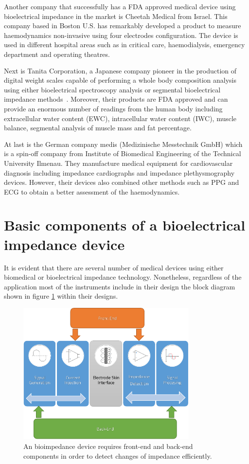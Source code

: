 Another company that successfully has a FDA approved medical device using bioelectrical impedance in the market is Cheetah Medical \cite{cheetah} from Israel. This company based in Boston U.S. has remarkably developed a product to measure haemodynamics non-invasive using four electrodes configuration. The device is used in different hospital areas such as in critical care, haemodialysis, emergency department and operating theatres.

Next is Tanita Corporation, a Japanese company pioneer in the production of digital weight scales capable of performing a whole body composition analysis using either bioelectrical spectroscopy analysis or segmental bioelectrical impedance methods~\cite{tanita}. Moreover, their products are FDA approved and can provide an enormous number of readings from the human body including extracellular water content (EWC), intracellular water content (IWC), muscle balance, segmental analysis of muscle mass and fat percentage.

At last is the German company medis (Medizinische Messtechnik GmbH) which is a spin-off company from Institute of Biomedical Engineering of the Technical University Ilmenau. They manufacture medical equipment for cardiovascular diagnosis including impedance cardiographs and impedance plethysmography devices. However, their devices also combined other methods such as PPG and ECG to obtain a better assessment of the haemodynamics. 

\section{Basic components of a bioelectrical impedance device}
\label{section impedance basic}
It is evident that there are several number of medical devices using either biomedical or bioelectrical impedance technology. Nonetheless, regardless of the application most of the instruments include in their design the block diagram shown in figure \ref{fig:block diagram bioimpedance} within their designs. 

\begin{figure}[!htpb]
	\centering
	\includegraphics[width=9cm,keepaspectratio]{figure11}    
	\caption[Block diagram of a common bioimpedance device]{An bioimpedance device requires front-end and back-end components in order to detect changes of impedance efficiently.}
	\label{fig:block diagram bioimpedance}
\end{figure}

